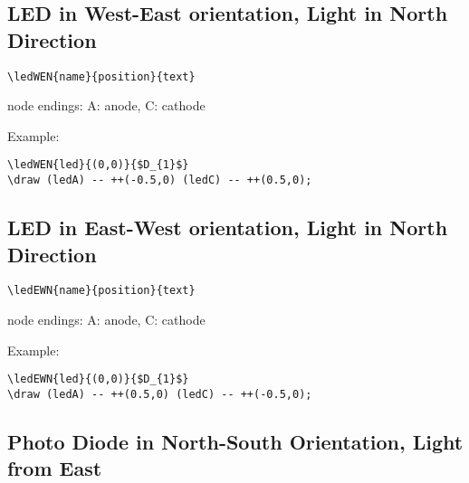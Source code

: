 \documentclass[parskip=full]{scrartcl}
\begin{document}
\subsection{LED in West-East orientation, Light in North Direction}

\begin{verbatim}
\ledWEN{name}{position}{text}
\end{verbatim}
node endings: A: anode, C: cathode

Example:\\
\begin{minipage}{0.8\textwidth}
\begin{verbatim}
\ledWEN{led}{(0,0)}{$D_{1}$}
\draw (ledA) -- ++(-0.5,0) (ledC) -- ++(0.5,0);
\end{verbatim}
\end{minipage}
\begin{minipage}{0.19\textwidth}
\end{minipage}

\subsection{LED in East-West orientation, Light in North Direction}

\begin{verbatim}
\ledEWN{name}{position}{text}
\end{verbatim}
node endings: A: anode, C: cathode

Example:\\
\begin{minipage}{0.8\textwidth}
\begin{verbatim}
\ledEWN{led}{(0,0)}{$D_{1}$}
\draw (ledA) -- ++(0.5,0) (ledC) -- ++(-0.5,0);
\end{verbatim}
\end{minipage}
\begin{minipage}{0.19\textwidth}
\end{minipage}

\subsection{Photo Diode in North-South Orientation, Light from East}
\end{document}
